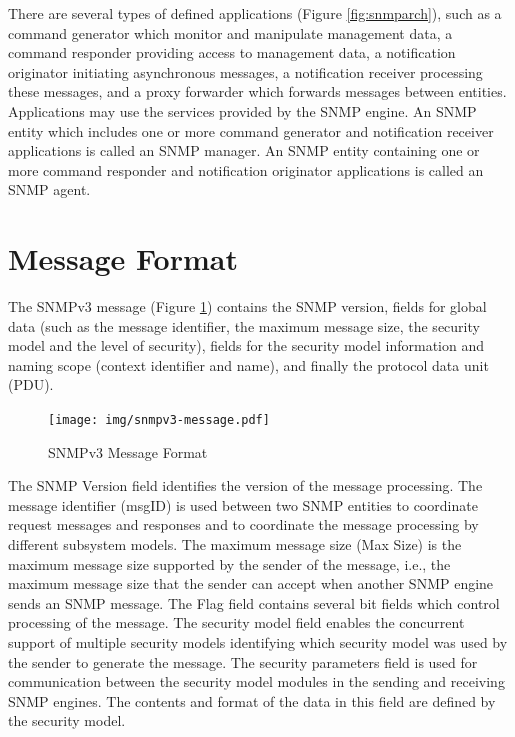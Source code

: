 There are several types of defined applications (Figure \ref{fig:snmparch}), such as a command generator which monitor and manipulate management data, a command responder providing access to management data, a notification originator initiating asynchronous messages, a notification receiver processing these messages, and a proxy forwarder which forwards messages between entities. Applications may use the services provided by the SNMP engine. An SNMP entity which includes one or more command generator and notification receiver applications is called an SNMP manager. An SNMP entity containing one or more command responder and notification originator applications is called an SNMP agent.

\section{Message Format}\label{sec:messformat}
The SNMPv3 message (Figure \ref{fig:snmp-format}) contains the SNMP version, fields for global data (such as the message identifier, the maximum message size, the security model and the level of security), fields for the security model information and naming scope (context identifier and name), and finally the protocol data unit (PDU).
\begin{figure}[htp]	
\begin{center}
    \texttt{[image: img/snmpv3-message.pdf]}
    \caption{SNMPv3 Message Format}   
	\label{fig:snmp-format}
\end{center}
\end{figure}

The SNMP Version field identifies the version of the message processing. The message identifier (msgID) is used between two SNMP entities to coordinate request messages and responses and to coordinate the message processing by different subsystem models. The maximum message size (Max Size) is the maximum message size supported by the sender of the message, i.e., the maximum message size that the sender can accept when another SNMP engine sends an SNMP message. The Flag field contains several bit fields which control processing of the message. The security model field enables the concurrent support of multiple security models identifying which security model was used by the sender to generate the message. The security parameters field is used for communication between the security model modules in the sending and receiving SNMP engines. The contents and format of the data in this field are defined by the security model.

